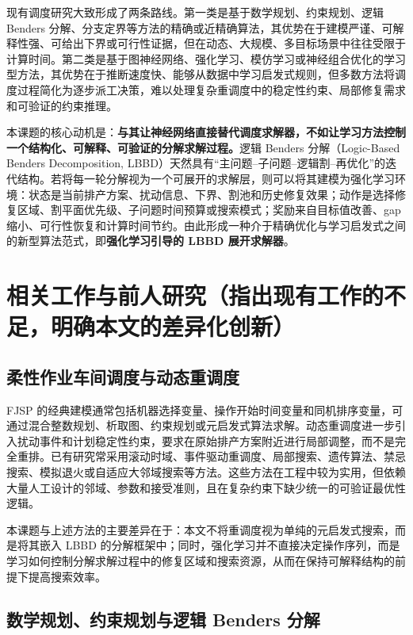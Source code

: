 \documentclass[UTF8,12pt,a4paper]{ctexart}
\begin{document}
现有调度研究大致形成了两条路线。第一类是基于数学规划、约束规划、逻辑 Benders 分解、分支定界等方法的精确或近精确算法，其优势在于建模严谨、可解释性强、可给出下界或可行性证据，但在动态、大规模、多目标场景中往往受限于计算时间\cite{ref_lbbd,ref_cp_fjsp}。第二类是基于图神经网络、强化学习、模仿学习或神经组合优化的学习型方法，其优势在于推断速度快、能够从数据中学习启发式规则，但多数方法将调度过程简化为逐步派工决策，难以处理复杂重调度中的稳定性约束、局部修复需求和可验证的约束推理\cite{ref_gnn_rl_jssp,ref_neural_co}。

本课题的核心动机是：\textbf{与其让神经网络直接替代调度求解器，不如让学习方法控制一个结构化、可解释、可验证的分解求解过程。}逻辑 Benders 分解（Logic-Based Benders Decomposition, LBBD）天然具有“主问题--子问题--逻辑割--再优化”的迭代结构。若将每一轮分解视为一个可展开的求解层，则可以将其建模为强化学习环境：状态是当前排产方案、扰动信息、下界、割池和历史修复效果；动作是选择修复区域、割平面优先级、子问题时间预算或搜索模式；奖励来自目标值改善、gap 缩小、可行性恢复和计算时间节约。由此形成一种介于精确优化与学习启发式之间的新型算法范式，即\textbf{强化学习引导的 LBBD 展开求解器}。

\section{相关工作与前人研究（指出现有工作的不足，明确本文的差异化创新）}

\subsection{柔性作业车间调度与动态重调度}

FJSP 的经典建模通常包括机器选择变量、操作开始时间变量和同机排序变量，可通过混合整数规划、析取图、约束规划或元启发式算法求解\cite{ref_fjsp_survey,ref_scheduling_book}。动态重调度进一步引入扰动事件和计划稳定性约束，要求在原始排产方案附近进行局部调整，而不是完全重排。已有研究常采用滚动时域、事件驱动重调度、局部搜索、遗传算法、禁忌搜索、模拟退火或自适应大邻域搜索等方法\cite{ref_rescheduling_survey,ref_alns}。这些方法在工程中较为实用，但依赖大量人工设计的邻域、参数和接受准则，且在复杂约束下缺少统一的可验证最优性逻辑。

本课题与上述方法的主要差异在于：本文不将重调度视为单纯的元启发式搜索，而是将其嵌入 LBBD 的分解框架中；同时，强化学习并不直接决定操作序列，而是学习如何控制分解求解过程中的修复区域和搜索资源，从而在保持可解释结构的前提下提高搜索效率。

\subsection{数学规划、约束规划与逻辑 Benders 分解}
\end{document}
